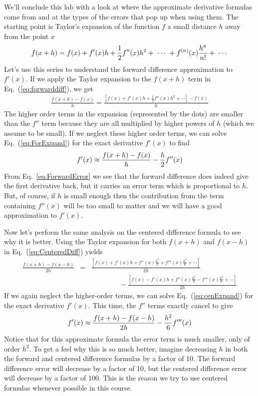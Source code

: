 We'll conclude this lab with a look at where the approximate
derivative formulas come from and at the types of the errors that pop
up when using them. The starting point is Taylor's expansion of the
function $f$ a small distance $h$ away from the point $x$
\begin{equation}\label{eq:Taylor}
    f(x+h) = f(x) + f'(x) h + {1 \over 2} f''(x) h^2 +
    ~\cdots~+ f^{(n)}(x) {h^n \over n!}
    +~\cdots
\end{equation}
Let's use this series to understand the forward difference
approximation to $f'(x)$. If we apply the Taylor expansion to the
$f(x+h)$ term in Eq.~(\ref{eq:forwarddiff}), we get
\begin{eqnarray}\label{eq:ForExpand}
    \frac{f(x+h)-f(x)}{h}
    = \frac{\left[f(x)+f'(x)h + \frac{1}{2} f''(x) h^2 + \cdots \right]-f(x)}{h}
\end{eqnarray}
The higher order terms in the expansion (represented by the dots) are
smaller than the $f''$ term because they are all multiplied by higher
powers of $h$ (which we assume to be small). If we neglect these
higher order terms, we can solve Eq.~(\ref{eq:ForExpand}) for the
exact derivative $f'(x)$ to find
\begin{equation} \label{eq:ForwardError}
    f'(x) \approx {f(x+h)-f(x) \over h} - {h \over 2} f''(x)
\end{equation}
From Eq.~\eqref{eq:ForwardError} we see that the forward difference
does indeed give the first derivative back, but it carries an error
term which is proportional to $h$. But, of course, if $h$ is small
enough then the contribution from the term containing $f''(x)$ will
be too small to matter and we will have a good approximation to
$f'(x)$.

Now let's perform the same analysis on the centered difference
formula to see why it is better. Using the Taylor expansion for both
$f(x+h)$ and $f(x-h)$ in Eq.~(\ref{eq:CenteredDiff}) yields
\begin{eqnarray}\label{eq:cenExpand}
    \frac{f(x+h)-f(x-h)}{2 h} &=&
    \frac{\left[f(x)+f'(x)h + f''(x) \frac{h^2}{2}+f'''(x) \frac{h^3}{6} + \cdots \right]}{2 h}
    \\
    & & \qquad \qquad -
    \frac{\left[ f(x)-f'(x)h + f''(x) \frac{h^2}{2}-f'''(x)\frac{h^3}{6} + \cdots \right] }{2 h}
    \nonumber
\end{eqnarray}
If we again neglect the higher-order terms, we can solve
Eq.~(\ref{eq:cenExpand}) for the exact derivative $f'(x)$. This time,
the $f''$ terms exactly cancel to give
\begin{equation} \label{eq:CenteredError}
    f'(x) \approx {f(x+h)-f(x-h) \over 2 h} - {h^2 \over 6} f'''(x)
\end{equation}
Notice that for this approximate formula the error term is much smaller, only
of order $h^2$. To get a feel why this is so much better, imagine decreasing
$h$ in both the forward and centered difference formulas by a factor of 10.
The forward difference error will decrease by a factor of 10, but the
centered difference error will decrease by a factor of 100. This is the
reason we try to use centered formulas whenever possible in this course.

